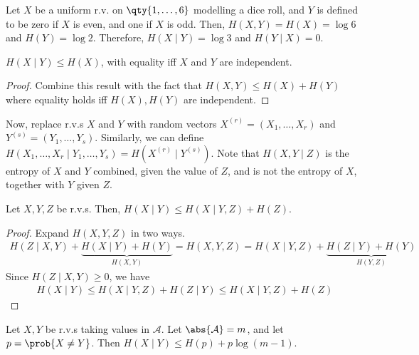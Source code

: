 \begin{example}
    Let $X$ be a uniform r.v. on $\qty{1, \dots, 6}$ modelling a dice roll, and $Y$ is defined to be zero if $X$ is even, and one if $X$ is odd.
    Then, $H(X,Y) = H(X) = \log 6$ and $H(Y) = \log 2$.
    Therefore, $H(X \mid Y) = \log 3$ and $H(Y \mid X) = 0$.
\end{example}

\begin{corollary}
    $H(X\mid Y) \leq H(X)$, with equality iff $X$ and $Y$ are independent.
\end{corollary}

\begin{proof}
    Combine this result with the fact that $H(X,Y) \leq H(X) + H(Y)$ where equality holds iff $H(X), H(Y)$ are independent.
\end{proof}

Now, replace r.v.s $X$ and $Y$ with random vectors $X^{(r)} = (X_1, \dots, X_r)$ and $Y^{(s)} = (Y_1, \dots, Y_s)$.
Similarly, we can define $H(X_1, \dots, X_r \mid Y_1, \dots, Y_s) = H(X^{(r)} \mid Y^{(s)})$.
Note that $H(X,Y\mid Z)$ is the entropy of $X$ and $Y$ combined, given the value of $Z$, and is not the entropy of $X$, together with $Y$ given $Z$.

\begin{lemma}
    Let $X, Y, Z$ be r.v.s.
    Then, $H(X \mid Y) \leq H(X \mid Y, Z) + H(Z)$.
\end{lemma}

\begin{proof}
    Expand $H(X,Y,Z)$ in two ways.
    \begin{align*}
        H(Z \mid X,Y) + \underbrace{H(X\mid Y) + H(Y)}_{H(X,Y)} = H(X,Y,Z) = H(X \mid Y,Z) + \underbrace{H(Z \mid Y) + H(Y)}_{H(Y,Z)}
    \end{align*}
    Since $H(Z \mid X,Y) \geq 0$, we have
    \begin{align*}
        H(X \mid Y) \leq H(X \mid Y,Z) + H(Z \mid Y) \leq H(X \mid Y,Z) + H(Z)
    \end{align*}
\end{proof}

\begin{proposition}
    Let $X, Y$ be r.v.s taking values in $\mathcal A$.
    Let $\abs{\mathcal A} = m$, and let $p = \prob{X \neq Y}$.
    Then $H(X \mid Y) \leq H(p) + p \log(m-1)$.
\end{proposition}

